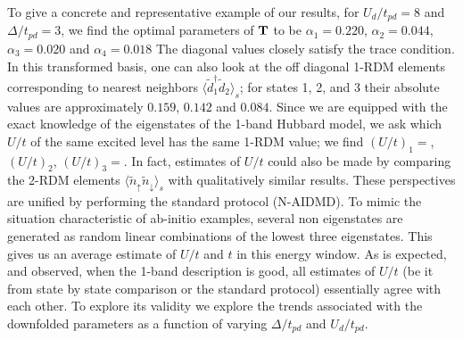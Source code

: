 To give a concrete and representative example of our results, for $U_d/t_{pd}=8$ and $\Delta/t_{pd}=3$, 
we find the optimal parameters of ${\bf T}$ to be 
$\alpha_1=0.220$, $\alpha_2=0.044$, $\alpha_3=0.020$ and $\alpha_4=0.018$ 
The diagonal values closely satisfy the trace condition. In this transformed basis, one can also 
look at the off diagonal 1-RDM elements corresponding to nearest neighbors $\langle \tilde{d}_1^{\dagger} \tilde{d}_2 \rangle_s$; 
for states 1, 2, and 3 their absolute values are approximately $0.159$, $0.142$ and $0.084$. Since we are equipped with the 
exact knowledge of the eigenstates of the 1-band Hubbard model, we ask which 
$U/t$ of the same excited level has the same 1-RDM value; we find $(U/t)_1 = $, $(U/t)_2$, $(U/t)_3 = $. 
In fact, estimates of $U/t$ could also be made by comparing the 2-RDM elements 
$\langle \tilde{n}_{\uparrow} \tilde{n}_{\downarrow} \rangle_s$ with qualitatively similar results. 
These perspectives are unified by performing the standard protocol (N-AIDMD). 
To mimic the situation characteristic of ab-initio examples, several non eigenstates are generated as 
random linear combinations of the lowest three eigenstates. This gives us an average estimate of $U/t$ 
and $t$ in this energy window. As is expected, and observed, when the 1-band 
description is good, all estimates of $U/t$ (be it from state by state comparison or the standard protocol) 
essentially agree with each other. To explore its validity we explore 
the trends associated with the downfolded parameters as a function of varying $\Delta/t_{pd}$ and 
$U_d/t_{pd}$.

